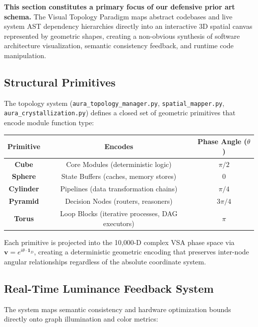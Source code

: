 \documentclass[11pt]{article}
\begin{document}
\textbf{This section constitutes a primary focus of our defensive prior art schema.} The Visual Topology Paradigm maps abstract codebases and live system AST dependency hierarchies directly into an interactive 3D spatial canvas represented by geometric shapes, creating a non-obvious synthesis of software architecture visualization, semantic consistency feedback, and runtime code manipulation.

\subsection{Structural Primitives}

The topology system (\texttt{aura\_topology\_manager.py}, \texttt{spatial\_mapper.py}, \texttt{aura\_crystallization.py}) defines a closed set of geometric primitives that encode module function type:

\begin{center}
\begin{tabular}{c|c|c}
\textbf{Primitive} & \textbf{Encodes} & \textbf{Phase Angle ($\theta$)} \\
\hline
\textbf{Cube} & Core Modules (deterministic logic) & $\pi/2$ \\
\textbf{Sphere} & State Buffers (caches, memory stores) & $0$ \\
\textbf{Cylinder} & Pipelines (data transformation chains) & $\pi/4$ \\
\textbf{Pyramid} & Decision Nodes (routers, reasoners) & $3\pi/4$ \\
\textbf{Torus} & Loop Blocks (iterative processes, DAG executors) & $\pi$ \\
\end{tabular}
\end{center}

Each primitive is projected into the 10,000-D complex VSA phase space via $\mathbf{v} = e^{i\theta \cdot \mathbf{1}_{D}}$, creating a deterministic geometric encoding that preserves inter-node angular relationships regardless of the absolute coordinate system.

\subsection{Real-Time Luminance Feedback System}

The system maps semantic consistency and hardware optimization bounds directly onto graph illumination and color metrics:
\end{document}
